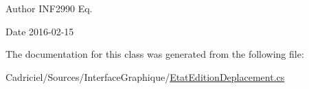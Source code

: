 \begin{DoxyAuthor}{Author}
I\+N\+F2990 Eq. 
\end{DoxyAuthor}
\begin{DoxyDate}{Date}
2016-\/02-\/15 
\end{DoxyDate}


The documentation for this class was generated from the following file\+:\begin{DoxyCompactItemize}
\item 
Cadriciel/\+Sources/\+Interface\+Graphique/\hyperlink{_etat_edition_deplacement_8cs}{Etat\+Edition\+Deplacement.\+cs}\end{DoxyCompactItemize}
